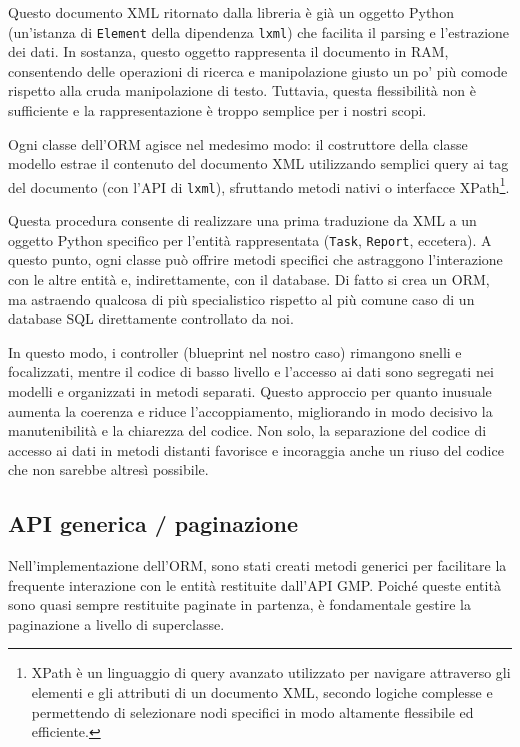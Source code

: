 Questo documento XML ritornato dalla libreria è già un oggetto Python (un'istanza di \texttt{Element} della dipendenza \texttt{lxml}) che facilita il parsing e l'estrazione dei dati. In sostanza, questo oggetto rappresenta il documento in RAM, consentendo delle operazioni di ricerca e manipolazione giusto un po' più comode rispetto alla cruda manipolazione di testo. Tuttavia, questa flessibilità non è sufficiente e la rappresentazione è troppo semplice per i nostri scopi.

Ogni classe dell'ORM agisce nel medesimo modo: il costruttore della classe modello estrae il contenuto del documento XML utilizzando semplici query ai tag del documento (con l'API di \texttt{lxml}), sfruttando metodi nativi o interfacce XPath\footnote{XPath è un linguaggio di query avanzato utilizzato per navigare attraverso gli elementi e gli attributi di un documento XML, secondo logiche complesse e permettendo di selezionare nodi specifici in modo altamente flessibile ed efficiente.}.

Questa procedura consente di realizzare una prima traduzione da XML a un oggetto Python specifico per l'entità rappresentata (\texttt{Task}, \texttt{Report}, eccetera). A questo punto, ogni classe può offrire metodi specifici che astraggono l'interazione con le altre entità e, indirettamente, con il database. Di fatto si crea un ORM, ma astraendo qualcosa di più specialistico rispetto al più comune caso di un database SQL direttamente controllato da noi.

In questo modo, i controller (blueprint nel nostro caso) rimangono snelli e focalizzati, mentre il codice di basso livello e l'accesso ai dati sono segregati nei modelli e organizzati in metodi separati. Questo approccio per quanto inusuale aumenta la coerenza e riduce l'accoppiamento, migliorando in modo decisivo la manutenibilità e la chiarezza del codice. Non solo, la separazione del codice di accesso ai dati in metodi distanti favorisce e incoraggia anche un riuso del codice che non sarebbe altresì possibile.

\subsection{API generica / paginazione}
Nell'implementazione dell'ORM, sono stati creati metodi generici per facilitare la frequente interazione con le entità restituite dall'API GMP. Poiché queste entità sono quasi sempre restituite paginate in partenza, è fondamentale gestire la paginazione a livello di superclasse.

